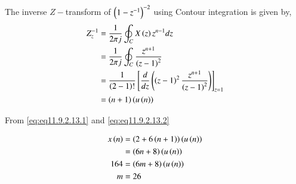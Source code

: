 \documentclass[journal,12pt,twocolumn]{IEEEtran}
\begin{document}
The inverse $Z-$transform of $\left(1-z^{-1}\right)^{-2}$ using Contour integration is given by,
\begin{align}
    Z_z^{-1} &= \frac{1}{2\pi j}\oint_C X\left(z\right)z^{n-1}dz\\
    &= \frac{1}{2\pi j}\oint_C \frac{z^{n+1}}{\left(z-1\right)^2}\\
    &= \frac{1}{\left(2-1\right)!}\left[ \frac{d}{dz}\left(\left(z-1\right)^2 \frac{z^{n+1}}{\left(z-1\right)^2}\right) \right]_{z=1}\\
    &= \left(n+1\right)\left(u\left(n\right)\right) \label{eq:eq11.9.2.13.2}
\end{align}

From \eqref{eq:eq11.9.2.13.1} and \eqref{eq:eq11.9.2.13.2}

\begin{align}
    x\left(n\right) &= \left(2 + 6\left(n+1\right)\right)\left(u\left(n\right)\right)\\
    &= \left(6n+8\right)\left(u\left(n\right)\right)\\
    164 &= \left(6m+8\right)\left(u\left(n\right)\right)\\
    m &= 26
\end{align}


\end{document}
